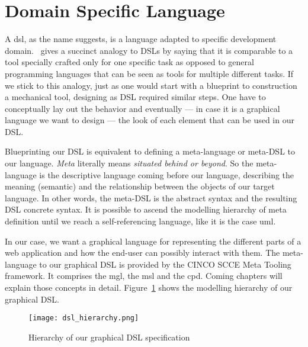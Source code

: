 \section[DSL]{Domain Specific Language}

A \acrfull{dsl}, as the name suggests, is a language adapted to specific development domain.~\cite{Naujokat2018} gives a succinct analogy to DSLs by saying that it is comparable to a tool specially crafted only for one specific task as opposed to general programming languages that can be seen as tools for multiple different tasks. If we stick to this analogy, just as one would start with a blueprint to construction a mechanical tool, designing as DSL required similar steps. One have to conceptually lay out the behavior and eventually --- in case it is a graphical language we want to design --- the look of each element that can be used in our DSL\@.

Blueprinting our DSL is equivalent to defining a meta-language or meta-DSL to our language. \textit{Meta} literally means \textit{situated behind or beyond}. So the meta-language is the descriptive language coming before our language, describing the meaning (semantic) and the relationship between the objects of our target language. In other words, the meta-DSL is the abstract syntax and the resulting DSL concrete syntax. It is possible to ascend the modelling hierarchy of meta definition until we reach a self-referencing language, like it is the case \acrfull{uml}.

In our case, we want a graphical language for representing the different parts of a web application and how the end-user can possibly interact with them. The meta-language to our graphical DSL is provided by the CINCO SCCE Meta Tooling framework. It comprises the \acrfull{mgl}, the \acrfull{msl} and the \acrfull{cpd}. Coming chapters will explain those concepts in detail. Figure~\ref{fig:modelling-hierachy} shows the modelling hierarchy of our graphical DSL\@.

\begin{figure}[h]
    \texttt{[image: dsl\_hierarchy.png]}
    \caption{Hierarchy of our graphical DSL specification}\label{fig:modelling-hierachy}
\end{figure}